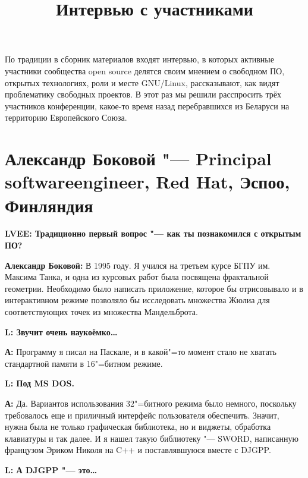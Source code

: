 \documentclass[10pt, a5paper]{article}
\begin{document}
\title{Интервью с участниками}
\date{}
\maketitle

По традиции в сборник материалов входят интервью, в которых активные участники
сообщества open source делятся своим мнением о свободном ПО, открытых
технологиях, роли и месте GNU/Linux, рассказывают, как видят проблематику
свободных проектов. В этот раз мы решили расспросить трёх участников
конференции, какое-то время назад перебравшихся из Беларуси на территорию
Европейского Союза.

\section[Александр Боковой "--- Principal software engineer, Red Hat, Эспоо,
Финляндия]{Александр Боковой "--- Principal software\linebreak engineer, Red
Hat, Эспоо, Финляндия}

{\noindent \bf LVEE: Традиционно первый вопрос "--- как ты познакомился с
открытым ПО?}

{\noindent \bf Александр Боковой:} В 1995 году. Я учился на третьем курсе БГПУ
им. Максима Танка, и одна из курсовых работ была посвящена фрактальной
геометрии. Необходимо было написать приложение, которое бы отрисовывало и в
интерактивном режиме позволяло бы исследовать множества Жюлиа для
соответствующих точек из множества Мандельброта. 

{\noindent \bf L: Звучит очень наукоёмко\ldots}

{\noindent \bf А:} Программу я писал на Паскале, и в какой"=то момент стало не
хватать стандартной памяти в 16"=битном режиме.

{\noindent \bf L: Под MS DOS.} 

{\noindent \bf А:}  Да. Вариантов использования 32"=битного режима было
немного, поскольку требовалось еще и приличный интерфейс пользователя
обеспечить. Значит, нужна была не только графическая библиотека, но и виджеты,
обработка клавиатуры и так далее. И я нашел такую библиотеку "--- SWORD,
написанную французом Эриком Николя на C++ и поставлявшуюся вместе с DJGPP.

{\noindent \bf L: А DJGPP "--- это\ldots}
\end{document}
